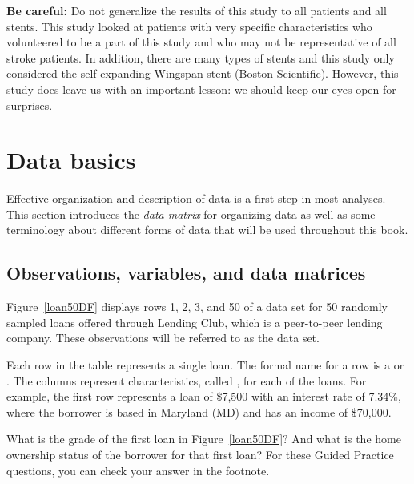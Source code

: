 \textbf{Be careful:}
Do not generalize the results of this study to all patients
and all stents.
This study looked at patients with very specific characteristics
who volunteered to be a part of this study and who may not be
representative of all stroke patients.
In addition, there are many types of stents and this study only
considered the self-expanding Wingspan stent (Boston Scientific).
However, this study does leave us with an important lesson:
we should keep our eyes open for surprises.



{}



\section{Data basics}
\label{dataBasics}

Effective organization and description of data is a first
step in most analyses.
This section introduces the \emph{data matrix} for organizing
data as well as some terminology about different forms of data
that will be used throughout this book.

\subsection{Observations, variables, and data matrices}


Figure~\ref{loan50DF} displays rows 1, 2, 3, and 50 of a data set
for 50 randomly sampled loans offered through Lending Club,
which is a peer-to-peer lending company.
These observations will be referred to as the
 data set.

Each row in the table represents a single loan.
The formal name for a row is a 
or .
The columns represent characteristics,
called ,
for each of the loans.
For example, the first row represents a loan of \$7,500 with an interest rate of 7.34\%, where the borrower is based in Maryland (MD) and has an income of \$70,000.

\begin{exercisewrap}
\begin{nexercise}
What is the grade of the first loan in Figure~\ref{loan50DF}?
And what is the home ownership status of the borrower
for that first loan?
For these Guided Practice questions, you can check your answer
in the footnote.\footnotemark{}
\end{nexercise}
\end{exercisewrap}

